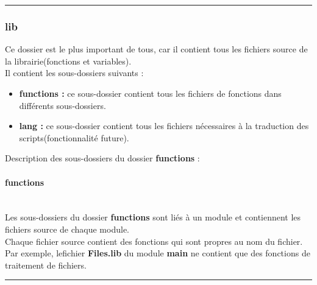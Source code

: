 \documentclass[a4paper,10pt]{article}
\begin{document}
\color{blue}\par\noindent\rule{\textwidth}{0.4pt}\color{white}

\color{blue}
\subsubsection{lib}\color{white}
Ce dossier est le plus important de tous, car il contient tous les fichiers source de la librairie\linebreak (fonctions et variables).\\[1\baselineskip]

Il contient les sous-dossiers suivants :
\begin{itemize}
    \item \color{lime}\textbf{functions\color{white} :} \color{white} ce sous-dossier contient tous les fichiers de fonctions dans différents sous-dossiers.\\[1\baselineskip]

    \item \color{lime}\textbf{lang\color{white} :} \color{white} ce sous-dossier contient tous les fichiers nécessaires à la traduction des scripts\linebreak (fonctionnalité future).\\[1\baselineskip]
\end{itemize}

Description des sous-dossiers du dossier \textbf{functions} :\\[1\baselineskip]

\setcounter{secnumdepth}{4}
\paragraph{functions}\mbox{}\\
Les sous-dossiers du dossier \textbf{functions} sont liés à un module et contiennent les fichiers source de chaque module.\\[1\baselineskip]

Chaque fichier source contient des fonctions qui sont propres au nom du fichier. Par exemple, le\linebreak fichier \textbf{\color{lime}Files.lib\color{white}} du module \textbf{main} ne contient que des fonctions de traitement de fichiers.\\[1\baselineskip]



\par\noindent\rule{\textwidth}{0.4pt}
\end{document}
